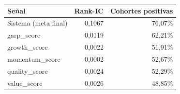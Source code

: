 \begin{tabular}{lrr}
\toprule
Señal & Rank-IC & Cohortes positivas \\
\midrule
Sistema (meta final) & 0,1067 & 76,07\% \\
garp\_score & 0,0119 & 62,21\% \\
growth\_score & 0,0022 & 51,91\% \\
momentum\_score & -0,0002 & 52,67\% \\
quality\_score & 0,0024 & 52,29\% \\
value\_score & 0,0026 & 48,85\% \\
\bottomrule
\end{tabular}
